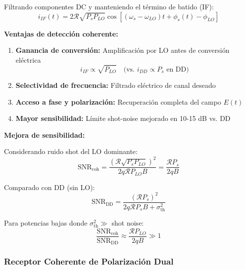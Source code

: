 \documentclass[11pt,a4paper]{article}
\begin{document}
Filtrando componentes DC y manteniendo el término de batido (IF):
\begin{equation}
    i_{IF}(t) = 2\mathcal{R}\sqrt{P_s P_{LO}}\cos[(\omega_s - \omega_{LO})t + \phi_s(t) - \phi_{LO}]
\end{equation}

\textbf{Ventajas de detección coherente:}

\begin{enumerate}
    \item \textbf{Ganancia de conversión:} Amplificación por LO antes de conversión eléctrica
    \begin{equation}
        i_{IF} \propto \sqrt{P_{LO}} \quad \text{(vs. } i_{DD} \propto P_s \text{ en DD)}
    \end{equation}
    
    \item \textbf{Selectividad de frecuencia:} Filtrado eléctrico de canal deseado
    
    \item \textbf{Acceso a fase y polarización:} Recuperación completa del campo $E(t)$
    
    \item \textbf{Mayor sensibilidad:} Límite shot-noise mejorado en 10-15 dB vs. DD
\end{enumerate}

\textbf{Mejora de sensibilidad:}

Considerando ruido shot del LO dominante:
\begin{equation}
    \text{SNR}_{\text{coh}} = \frac{(\mathcal{R}\sqrt{P_s P_{LO}})^2}{2q\mathcal{R}P_{LO}B} = \frac{\mathcal{R}P_s}{2qB}
\end{equation}

Comparado con DD (sin LO):
\begin{equation}
    \text{SNR}_{\text{DD}} = \frac{(\mathcal{R}P_s)^2}{2q\mathcal{R}P_s B + \sigma_{\text{th}}^2}
\end{equation}

Para potencias bajas donde $\sigma_{\text{th}}^2 \gg$ shot noise:
\begin{equation}
    \frac{\text{SNR}_{\text{coh}}}{\text{SNR}_{\text{DD}}} \approx \frac{\mathcal{R}P_{LO}}{2qB} \gg 1
\end{equation}

\subsubsection{Receptor Coherente de Polarización Dual}
\end{document}
